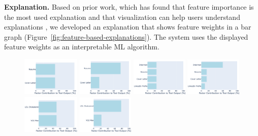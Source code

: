 \noindent\textbf{Explanation.} Based on prior work, which has found that feature importance is the most used explanation \cite{systematic2023nauta} and that visualization can help users understand explanations \cite{peeking2018adadi}, we developed an explanation that shows feature weights in a bar graph (Figure~\ref{fig:feature-based-explanations}). The system uses the displayed feature weights as an interpretable ML algorithm. 

\begin{figure}[ht]
    \centering 
    \hspace{.5em}\includegraphics[width=0.245\textwidth]{Figures/2-equal.png}
    \hspace{.5em}\includegraphics[width=0.24\textwidth]{Figures/2-unequal.png}
    \includegraphics[width=0.24\textwidth]{Figures/4-equal.png}
    \includegraphics[width=0.24\textwidth]{Figures/4-unequal.png}\\
    \hspace{.5em}\includegraphics[width=0.245\textwidth]{Figures/2_unf_bal.png}
    \hspace{.5em}\includegraphics[width=0.24\textwidth]{Figures/2_unf_unbal.png}

\end{figure}
